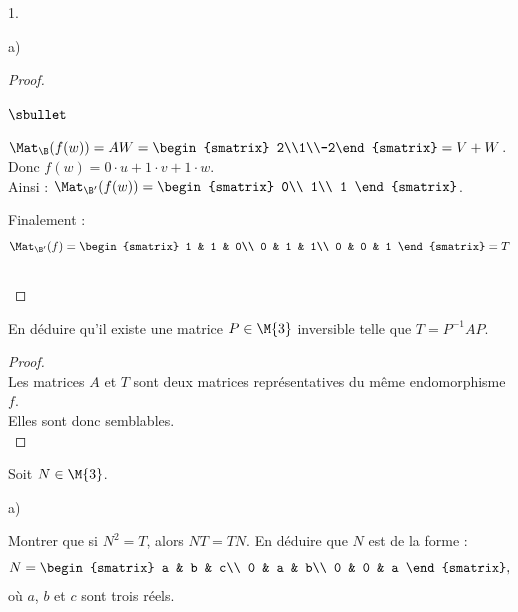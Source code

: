 \documentclass[11pt]{article}%
\begin{document}
\begin{noliste}{1.}
\begin{noliste}{a)}
\begin{proof}
\begin{noliste}{$\sbullet$}
      \item $\Mat_\B(f(w))=AW=\begin{smatrix} 2\\1\\-2\end{smatrix} =
        V+W$. Donc $f(w)=0\cdot u + 1\cdot v+1\cdot w$.\\[.2cm]
        Ainsi : $\Mat_{\B'}(f(w)) =
        \begin{smatrix}
          0\\
          1\\
          1
        \end{smatrix}$.
      \end{noliste}      
      Finalement :
      \[
      \Mat_{\B'}(f)= 
      \begin{smatrix} 
        1 & 1 & 0\\
        0 & 1 & 1\\
        0 & 0 & 1
      \end{smatrix} = T
      \]
      ~\\[-1cm]
    \end{proof}
    
  \item En déduire qu'il existe une matrice $P\in\M{3}$ 
    inversible telle que $T=P^{-1}AP$.
    
    \begin{proof}~\\
      Les matrices $A$ et $T$ sont deux matrices représentatives du
      même endomorphisme $f$. \\
      Elles sont donc semblables.  ~\\[-1cm]
    \end{proof}
  \end{noliste}
  
\item Soit $N\in\M{3}$.
  \begin{noliste}{a)}
  \item Montrer que si $N^2=T$, alors $NT=TN$. En déduire que $N$ 
    est de la forme :
    \[
    N=
    \begin{smatrix} 
      a & b & c\\ 
      0 & a & b\\ 
      0 & 0 & a
    \end{smatrix},
    \]
    où $a$, $b$ et $c$ sont trois réels.
    

\end{noliste}
\end{noliste}
\end{document}
